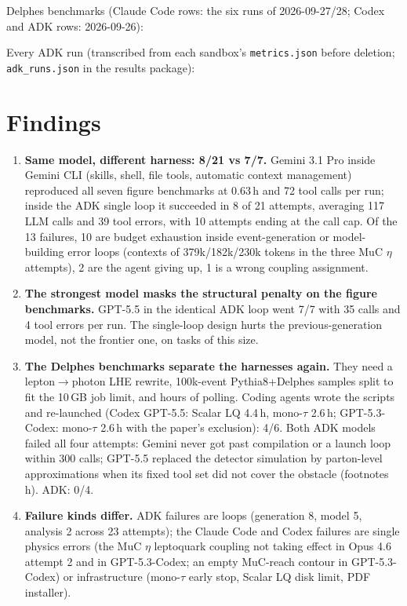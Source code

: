 \documentclass[10pt,a4paper]{article}
\newcommand{\code}[1]{\texttt{#1}}
\newcommand{\wide}[1]{\noindent\resizebox{\textwidth}{!}{#1}}
\begin{document}
\wide{\scriptsize\setlength{\tabcolsep}{3pt}}

Delphes benchmarks (Claude Code rows: the six runs of 2026-09-27/28; Codex and ADK rows: 2026-09-26):

\wide{\scriptsize\setlength{\tabcolsep}{3pt}}

Every ADK run (transcribed from each sandbox's \code{metrics.json} before deletion; \code{adk\_runs.json} in the results package):

\wide{}

\section{Findings}
\begin{enumerate}
\item \textbf{Same model, different harness: 8/21 vs 7/7.} Gemini 3.1 Pro inside Gemini CLI (skills, shell, file tools, automatic context management) reproduced all seven figure benchmarks at 0.63\,h and 72 tool calls per run; inside the ADK single loop it succeeded in 8 of 21 attempts, averaging 117 LLM calls and 39 tool errors, with 10 attempts ending at the call cap. Of the 13 failures, 10 are budget exhaustion inside event-generation or model-building error loops (contexts of 379k/182k/230k tokens in the three MuC $\eta$ attempts), 2 are the agent giving up, 1 is a wrong coupling assignment.
\item \textbf{The strongest model masks the structural penalty on the figure benchmarks.} GPT-5.5 in the identical ADK loop went 7/7 with 35 calls and 4 tool errors per run. The single-loop design hurts the previous-generation model, not the frontier one, on tasks of this size.
\item \textbf{The Delphes benchmarks separate the harnesses again.} They need a lepton$\to$photon LHE rewrite, 100k-event Pythia8+Delphes samples split to fit the 10\,GB job limit, and hours of polling. Coding agents wrote the scripts and re-launched (Codex GPT-5.5: Scalar LQ 4.4\,h, mono-$\tau$ 2.6\,h; GPT-5.3-Codex: mono-$\tau$ 2.6\,h with the paper's exclusion): 4/6. Both ADK models failed all four attempts: Gemini never got past compilation or a launch loop within 300 calls; GPT-5.5 replaced the detector simulation by parton-level approximations when its fixed tool set did not cover the obstacle (footnotes h). ADK: 0/4.
\item \textbf{Failure kinds differ.} ADK failures are loops (generation 8, model 5, analysis 2 across 23 attempts); the Claude Code and Codex failures are single physics errors (the MuC $\eta$ leptoquark coupling not taking effect in Opus 4.6 attempt 2 and in GPT-5.3-Codex; an empty MuC-reach contour in GPT-5.3-Codex) or infrastructure (mono-$\tau$ early stop, Scalar LQ disk limit, PDF installer).

\end{enumerate}
\end{document}
